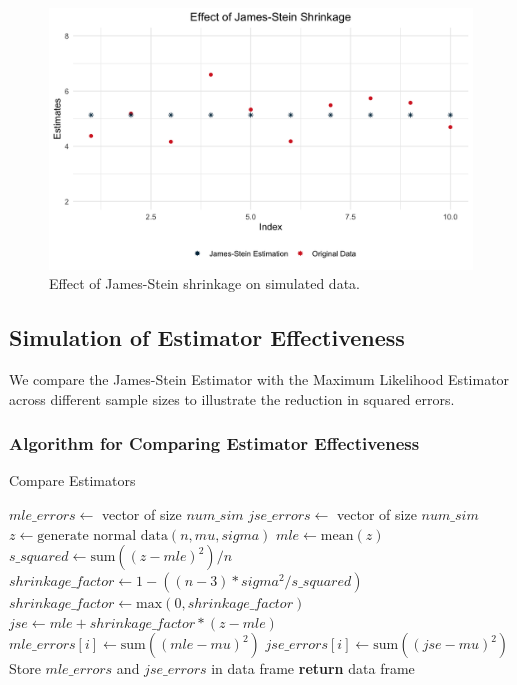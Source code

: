 \begin{figure}[H]
    \centering
    \includegraphics[width=1\textwidth]{images/Effect of James-Stein Shrinkage.png}
    \caption{Effect of James-Stein shrinkage on simulated data.}
    \label{fig:jse_shrinkage}
\end{figure}

\subsection{Simulation of Estimator Effectiveness}

We compare the James-Stein Estimator with the Maximum Likelihood Estimator across different sample sizes to illustrate the reduction in squared errors.

\newpage

\subsubsection{Algorithm for Comparing Estimator Effectiveness}
\begin{algorithm}
\caption{Compare Estimators}
\begin{algorithmic}[1]
        \State $mle\_errors \gets$ vector of size $num\_sim$
        \State $jse\_errors \gets$ vector of size $num\_sim$
            \State $z \gets \text{generate normal data}(n, mu, sigma)$
            \State $mle \gets \text{mean}(z)$
            \State $s\_squared \gets \text{sum}((z - mle)^2) / n$
            \State $shrinkage\_factor \gets 1 - ((n-3) * sigma^2 / s\_squared)$
            \State $shrinkage\_factor \gets \text{max}(0, shrinkage\_factor)$
            \State $jse \gets mle + shrinkage\_factor * (z - mle)$
            \State $mle\_errors[i] \gets \text{sum}((mle - mu)^2)$
            \State $jse\_errors[i] \gets \text{sum}((jse - mu)^2)$
        \EndFor
        \State Store $mle\_errors$ and $jse\_errors$ in data frame
    \EndFor
    \State \textbf{return} data frame
\EndProcedure
\end{algorithmic}
\end{algorithm}

